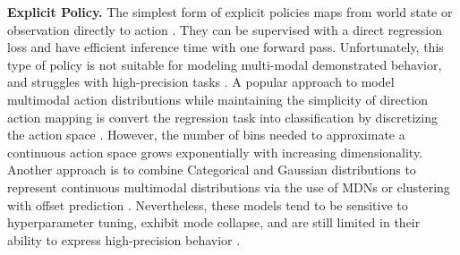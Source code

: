 \textbf{Explicit Policy.}
The simplest form of explicit policies maps from world state or observation directly to action \cite{pomerleau1988alvinn, zhang2018deep, florence2019self, ross2011reduction, toyer2020magical, rahmatizadeh2018vision, bojarski2016end}. They can be supervised with a direct regression loss and have efficient inference time with one forward pass. Unfortunately, this type of policy is not suitable for modeling multi-modal demonstrated behavior, 
and struggles with high-precision tasks \cite{ibc}.
A popular approach to model multimodal action distributions while maintaining the simplicity of direction action mapping is convert the regression task into classification by discretizing the action space \cite{zeng2021transporter, wu2020spatial, avigal2022speedfolding}. 
However, the number of bins needed to approximate a continuous action space grows exponentially with increasing dimensionality. 
Another approach is to combine Categorical and Gaussian distributions to represent continuous multimodal distributions via the use of MDNs \cite{bishop1994mixture, robomimic} or clustering with offset prediction \cite{bet, sharma2018multiple}. Nevertheless, these models tend to be sensitive to hyperparameter tuning, exhibit mode collapse, and are still limited in their ability to express high-precision behavior \cite{ibc}.

